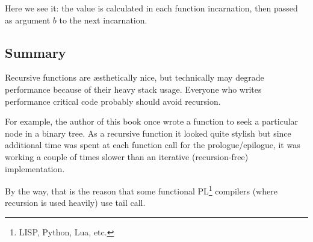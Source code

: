 

Here we see it: the  value is calculated in each function incarnation, then passed as
argument $b$ to the next incarnation.

\subsection{Summary}

\label{Recursion_and_tail_call}
\myindex{\Recursion}
Recursive functions are \ae{}sthetically nice, but technically may degrade performance because
of their heavy stack usage.
Everyone who writes performance critical code probably should avoid recursion.

For example, the author of this book once wrote a function to seek a particular node in a binary tree. 
As a recursive function it looked quite stylish but since additional time
was spent at each function call
for the prologue/epilogue, it was working a couple of times slower than an iterative (recursion-free)
implementation.

\newcommand{\FnFP}{\footnote{LISP, Python, Lua, etc.}}

By the way, that is the reason that some functional \ac{PL}\FnFP{} compilers (where recursion is used heavily) use \gls{tail call}.
